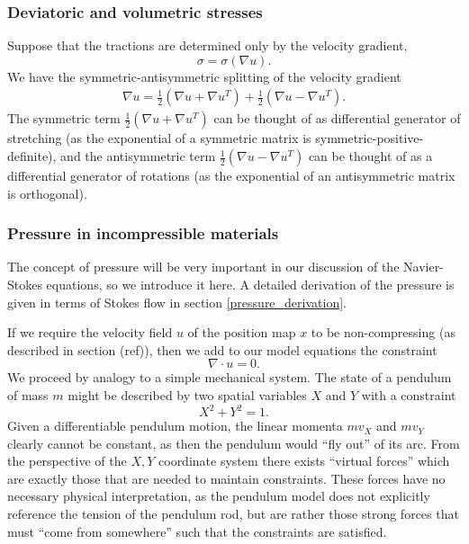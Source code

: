 \documentclass[11pt,a4paper]{memoir}
\begin{document}
\subsubsection{Deviatoric and volumetric stresses}
Suppose that the tractions are determined only by the velocity gradient,
    $$\sigma = \sigma(\nabla u).$$
We have the symmetric-antisymmetric splitting of the velocity gradient
\newcommand{\usym}{\frac{1}{2}\left(\nabla u + \nabla u^T\right)}
\newcommand{\uantisym}{\frac{1}{2}\left(\nabla u - \nabla u^T\right)}
\begin{align*}
    \nabla u = \usym + \uantisym.
\end{align*}
The symmetric term $\usym$ can be thought of as differential generator of stretching (as the exponential of a symmetric matrix is symmetric-positive-definite),
and the antisymmetric term $\uantisym$ can be thought of as a differential generator of rotations (as the exponential of an antisymmetric matrix is orthogonal).




\subsubsection{Pressure in incompressible materials}
The concept of pressure will be very important in our discussion of the Navier-Stokes equations, so we introduce it
here. A detailed derivation of the pressure is given in terms of Stokes flow in section \ref{pressure_derivation}.

If we require the velocity field $u$ of the position map $x$ to be non-compressing (as described in section (ref)),
then we add to our model equations the constraint
\begin{equation}\label{noncompressing_velocity}
    \nabla \cdot u = 0.
\end{equation}
We proceed by analogy to a simple mechanical system.
The state of a pendulum of mass $m$ might be described by two spatial variables $X$ and $Y$ with a constraint
    $$X^2 + Y^2 = 1.$$
Given a differentiable pendulum motion, the linear momenta $mv_X$ and $mv_Y$ clearly cannot be constant, as then the pendulum
would ``fly out'' of its arc.
From the perspective of the $X,Y$ coordinate system there exists ``virtual forces'' which are exactly those that are needed
to maintain constraints. These forces have no necessary physical interpretation, as the pendulum model does not explicitly reference
the tension of the pendulum rod, but are rather those strong forces that must ``come from somewhere'' such that the constraints
are satisfied.
\end{document}
